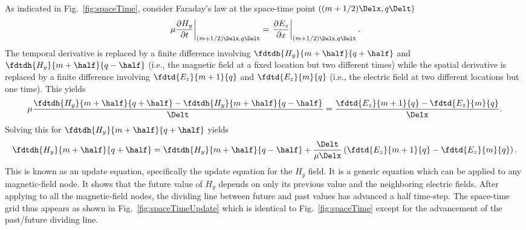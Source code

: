 As indicated in Fig.\ \ref{fig:spaceTime}, consider Faraday's
law at the space-time point $((m+1/2)\Delx,q\Delt)$
\begin{equation}
  \left.\mu
  \frac{\partial H_y}{\partial t}\right|_{(m+1/2)\Delx,q\Delt}
  =
  \left.\frac{\partial E_z}{\partial x}\right|_{(m+1/2)\Delx,q\Delt}.
  \label{eq:faradayDiscrete}
\end{equation}
The temporal derivative is replaced by a finite difference involving
$\fdtdh{H_y}{m+\half}{q+\half}$ and $\fdtdh{H_y}{m+\half}{q-\half}$
(i.e., the magnetic field at a fixed location but two different times)
while the spatial derivative is replaced by a finite difference
involving $\fdtd{E_z}{m+1}{q}$ and $\fdtd{E_z}{m}{q}$ (i.e., the
electric field at two different locations but one time).  This yields
\begin{equation}
  \mu\frac{\fdtdh{H_y}{m+\half}{q+\half} -
           \fdtdh{H_y}{m+\half}{q-\half}}{\Delt} = 
  \frac{\fdtd{E_z}{m+1}{q} - \fdtd{E_z}{m}{q}}{\Delx}.
  \label{eq:faradayFdtd1D}
\end{equation}
Solving this for $\fdtdh{H_y}{m+\half}{q+\half}$ yields
\begin{equation}
  \fdtdh{H_y}{m+\half}{q+\half} = \fdtdh{H_y}{m+\half}{q-\half} +
  \frac{\Delt}{\mu\Delx}
  \left(\fdtd{E_z}{m+1}{q} - \fdtd{E_z}{m}{q}\right).
  \label{eq:updateHy}
\end{equation}
This is known as an update equation, specifically the update equation
for the $H_y$ field.  It is a generic equation which can be applied to
any magnetic-field node.  It shows that the future value of $H_y$
depends on only its previous value and the neighboring electric
fields.  After applying  to all the magnetic-field
nodes, the dividing line between future and past values has advanced a
half time-step.  The space-time grid thus appears as shown in Fig.\
\ref{fig:spaceTimeUpdate} which is identical to Fig.\
\ref{fig:spaceTime} except for the advancement of the past/future
dividing line.

